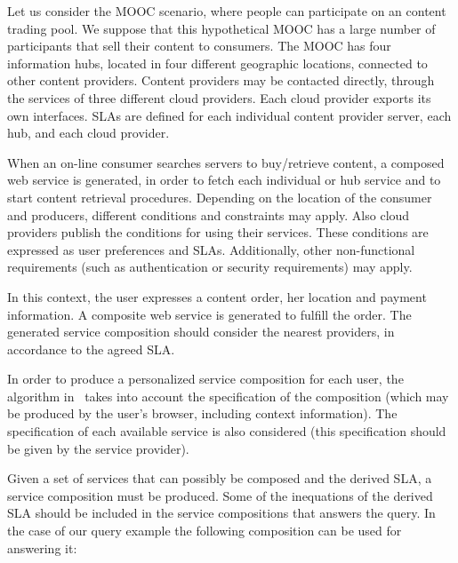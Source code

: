 Let us consider the MOOC scenario, where people can participate on an content trading pool.
We suppose that this hypothetical MOOC has a large number of participants that sell their content  to  consumers. 
The MOOC has four information hubs, located in four different geographic locations, connected to other content providers.
Content providers may be  contacted directly, through the services of three different cloud providers.
Each cloud provider exports its own interfaces.
SLAs are defined for each individual content provider server, each hub, and each cloud provider. 

When an on-line consumer searches servers to buy/retrieve content, a composed web service is generated, in order to fetch each individual or hub service and to start  content retrieval procedures.
Depending on the location of the consumer and producers, different conditions and constraints may apply.
Also  cloud providers  publish the conditions for using their services.
These conditions are expressed as user preferences and SLAs.
Additionally, other non-functional requirements (such as authentication or security requirements) may apply.

In this context, the user  expresses a content order, her location and payment information. A composite web service is  generated to fulfill the order.
The generated service composition should consider the nearest providers, in accordance to the agreed SLA.

In order to produce a personalized service composition for each user, the algorithm in~\cite{CostaAMR13} takes into account the specification of the composition (which may be produced by the user's browser, including context information).
The specification of each available service is also considered (this specification should be given by the service provider).


Given a set of services that can possibly be composed and the derived SLA, a service composition must be produced.
Some of the inequations of the derived SLA should be included in the service compositions that answers the query.
In the case of our query example the following composition can be used for answering it:

